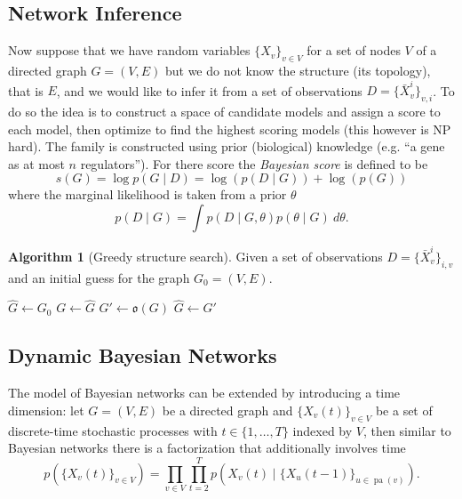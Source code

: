 \documentclass[a4paper]{article}
\newcommand{\given}{\mid}
\DeclareMathOperator{\pa}{pa} %
\theoremstyle{plain}
\theoremstyle{definition}
\newtheorem{alg}{Algorithm}[section]
\theoremstyle{remark}
\begin{document}
\subsection{Network Inference}

Now suppose that we have random variables $\{X_v\}_{v \in V}$ for a set of
nodes $V$ of a directed graph $G = (V,E)$ but we do not know the structure
(its topology), that is $E$, and we would like to infer it from a set of
observations $D = \{\bar{X}_v^i\}_{v,i}$. To do so the idea is to construct a
space of candidate models and assign a score to each model, then optimize to
find the highest scoring models (this however is NP hard). The family is
constructed using prior (biological) knowledge (e.g. ``a gene as at most $n$
regulators''). For there score the \emph{Bayesian score} is defined to be
\[
  s(G) = \log p(G \given D) = \log(p(D \given G)) + \log(p(G))
\]
where the marginal likelihood is taken from a prior $\theta$
\[
  p(D \given G) = \int p(D \given G, \theta) p(\theta \given G) ~ d\theta.
\]

\begin{alg}[Greedy structure search]
  Given a set of observations $D = \{\bar{X}_v^i\}_{i,v}$ and an initial guess
  for the graph $G_0 = (V,E)$.
  \begin{algorithmic}
      \State $\hat{G} \gets G_0$
      \Repeat
        \State $G \gets \hat{G}$
        \State {}
          \State $G' \gets \mathfrak{o}(G)$
              \State $\hat{G} \gets G'$
            \EndIf
          \EndIf
        \EndFor
    \EndFunction
  \end{algorithmic}
\end{alg}

\subsection{Dynamic Bayesian Networks}

The model of Bayesian networks can be extended by introducing a time
dimension: let $G = (V,E)$ be a directed graph and $\{X_v(t)\}_{v\in V}$ be a
set of discrete-time stochastic processes with $t \in \{1,\ldots, T\}$ indexed
by $V$, then similar to Bayesian networks there is a factorization that
additionally involves time
\[
  p(\{X_v(t)\}_{v \in V})
    = \prod_{v \in V} \prod_{t=2}^T p(X_v(t) \given 
      \{X_u(t-1)\}_{u \in \pa(v)}).
\]
\end{document}
